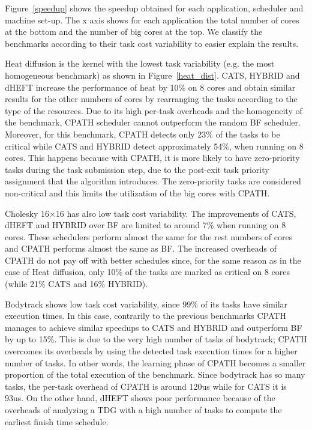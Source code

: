 Figure~\ref{speedup} shows the speedup obtained for each application,  scheduler and machine set-up.
The x axis shows for each application the total number of cores at the bottom and the number of big cores at the top.
We classify the benchmarks according to their task cost variability to easier explain the results.



Heat diffusion is the kernel with the lowest task variability (e.g. the most homogeneous benchmark) as shown in Figure~\ref{heat_dist}.
CATS, HYBRID and dHEFT increase the performance of heat by 10\% on 8 cores and obtain similar results for the other numbers of cores by rearranging the tasks according to the type of the resources.
Due to its high per-task overheads and the homogeneity of the benchmark, CPATH scheduler cannot outperform the random BF scheduler. 
Moreover, for this benchmark, CPATH detects only 23\% of the tasks to be critical while CATS and HYBRID detect approximately 54\%, when running on 8 cores.
This happens because with CPATH, it is more likely to have zero-priority tasks during the task submission step, due to the post-exit task priority assignment that the algorithm introduces. 
The zero-priority tasks are considered non-critical and this limits the utilization of the big cores with CPATH. 


Cholesky 16$\times$16 has also low task cost variability. 
The improvements of CATS, dHEFT and HYBRID over BF are limited to around 7\% when running on 8 cores.
These schedulers perform almost the same for the rest numbers of cores and CPATH performs almost the same as BF. 
The increased overheads of CPATH do not pay off with better schedules since, for the same reason as in the case of Heat diffusion, only 10\% of the tasks are marked as critical on 8 cores (while 21\% CATS and 16\% HYBRID).


Bodytrack shows low task cost variability, since 99\% of its tasks have similar execution times.
In this case, contrarily to the previous benchmarks CPATH manages to achieve similar speedups to CATS and HYBRID and outperform BF by up to 15\%.
This is due to the very high number of tasks of bodytrack; CPATH overcomes its overheads by using the detected task execution times for a higher number of tasks.
In other words, the learning phase of CPATH becomes a smaller proportion of the total execution of the benchmark.
Since bodytrack has so many tasks, the per-task overhead of CPATH is around 120us while for CATS it is 93us.
On the other hand, dHEFT shows poor performance because of the overheads of analyzing a TDG with a high number of tasks to compute the earliest finish time schedule.

